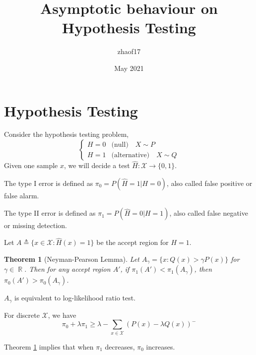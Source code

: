 \documentclass{article}
\title{Asymptotic behaviour on Hypothesis Testing }
\author{zhaof17 }
\date{May 2021}
\DeclareMathOperator{\R}{\mathbb{R}}
\newtheorem{theorem}{Theorem}
\begin{document}
\maketitle

\section{Hypothesis Testing}
Consider the hypothesis testing problem,
\begin{equation}
    \begin{cases}
    H=0 & \textrm{(null)} \quad X \sim P \\
    H=1 & \textrm{(alternative)} \quad X \sim Q
    \end{cases}
\end{equation}
Given one sample $x$, we will decide a test
$\widehat{H}: \mathcal{X} \to \{0,1\}$.

The type I error is defined as $\pi_0 = P(\widehat{H}=1
| H=0)$, also called false positive or false alarm.

The type II error is defined as $\pi_1 = P(\widehat{H}=0
| H=1)$,
also called false negative or missing detection.

Let $A\triangleq \{x\in \mathcal{X}: \widehat{H}(x)=1\}$
be the accept region for $H=1$.
\begin{theorem}[Neyman-Pearson Lemma]\label{thm:np}
Let $A_{\gamma} = \{x:Q(x) > \gamma P(x)\}$
for $\gamma \in \R$. Then for any accept region $A'$,
if $\pi_1(A') < \pi_1(A_{\gamma})$,
then $\pi_0(A') > \pi_0(A_{\gamma})$.
\end{theorem}
$A_{\gamma}$ is equivalent to log-likelihood ratio
test.

For discrete $\mathcal{X}$, we have
\begin{equation}\label{eq:p0p1}
\pi_0 + \lambda \pi_1 \geq \lambda - \sum_{x\in \mathcal{X}} (P(x) - \lambda Q(x))^{-}
\end{equation}

Theorem \ref{thm:np} implies that
when $\pi_1$ decreases, $\pi_0$ increases.
\end{document}
